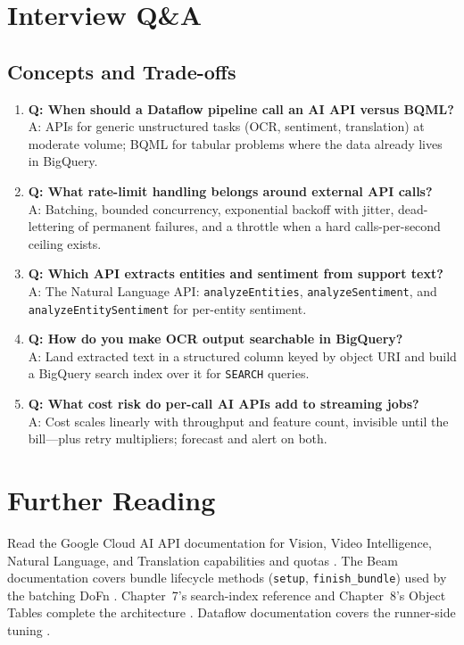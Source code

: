 \section{Interview Q\&A}
\subsection{Concepts and Trade-offs}
\begin{enumerate}
    \item \textbf{Q: When should a Dataflow pipeline call an AI API versus BQML?}\\
    A: APIs for generic unstructured tasks (OCR, sentiment, translation) at moderate volume; BQML for tabular problems where the data already lives in BigQuery.

    \item \textbf{Q: What rate-limit handling belongs around external API calls?}\\
    A: Batching, bounded concurrency, exponential backoff with jitter, dead-lettering of permanent failures, and a throttle when a hard calls-per-second ceiling exists.

    \item \textbf{Q: Which API extracts entities and sentiment from support text?}\\
    A: The Natural Language API: \texttt{analyzeEntities}, \texttt{analyzeSentiment}, and \texttt{analyzeEntitySentiment} for per-entity sentiment.

    \item \textbf{Q: How do you make OCR output searchable in BigQuery?}\\
    A: Land extracted text in a structured column keyed by object URI and build a BigQuery search index over it for \texttt{SEARCH} queries.

    \item \textbf{Q: What cost risk do per-call AI APIs add to streaming jobs?}\\
    A: Cost scales linearly with throughput and feature count, invisible until the bill---plus retry multipliers; forecast and alert on both.
\end{enumerate}

\section{Further Reading}
Read the Google Cloud AI API documentation for Vision, Video Intelligence, Natural Language, and Translation capabilities and quotas \cite{googlecloudaiapis}. The Beam documentation covers bundle lifecycle methods (\texttt{setup}, \texttt{finish\_bundle}) used by the batching DoFn \cite{apachebeamdocs}. Chapter~7's search-index reference and Chapter~8's Object Tables complete the architecture \cite{googlecloudbigquerydocs,googlecloudbiglake}. Dataflow documentation covers the runner-side tuning \cite{googleclouddataflowdocs}.

